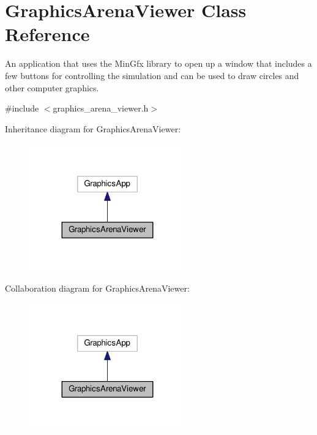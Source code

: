 \hypertarget{classGraphicsArenaViewer}{}\section{Graphics\+Arena\+Viewer Class Reference}
\label{classGraphicsArenaViewer}


An application that uses the Min\+Gfx library to open up a window that includes a few buttons for controlling the simulation and can be used to draw circles and other computer graphics.  




{\ttfamily \#include $<$graphics\+\_\+arena\+\_\+viewer.\+h$>$}



Inheritance diagram for Graphics\+Arena\+Viewer\+:
\nopagebreak
\begin{figure}[H]
\begin{center}
\leavevmode
\includegraphics[width=191pt]{classGraphicsArenaViewer__inherit__graph}
\end{center}
\end{figure}


Collaboration diagram for Graphics\+Arena\+Viewer\+:
\nopagebreak
\begin{figure}[H]
\begin{center}
\leavevmode
\includegraphics[width=191pt]{classGraphicsArenaViewer__coll__graph}
\end{center}
\end{figure}

